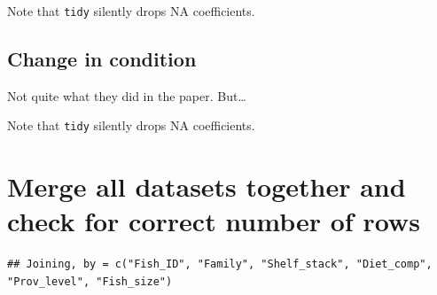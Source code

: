 \documentclass[]{book}
\newenvironment{Shaded}{\begin{snugshade}}{\end{snugshade}}
\newcommand{\DataTypeTok}[1]{\textcolor[rgb]{0.13,0.29,0.53}{#1}}
\newcommand{\KeywordTok}[1]{\textcolor[rgb]{0.13,0.29,0.53}{\textbf{#1}}}
\newcommand{\NormalTok}[1]{#1}
\newcommand{\OperatorTok}[1]{\textcolor[rgb]{0.81,0.36,0.00}{\textbf{#1}}}
\newcommand{\StringTok}[1]{\textcolor[rgb]{0.31,0.60,0.02}{#1}}
\begin{document}
Note that \texttt{tidy} silently drops NA coefficients.

\hypertarget{change-in-condition}{%
\subsection{Change in condition}\label{change-in-condition}}

Not quite what they did in the paper. But\ldots{}

\begin{Shaded}
\end{Shaded}

Note that \texttt{tidy} silently drops NA coefficients.

\hypertarget{merge-all-datasets-together-and-check-for-correct-number-of-rows}{%
\section{Merge all datasets together and check for correct number of rows}\label{merge-all-datasets-together-and-check-for-correct-number-of-rows}}

\begin{Shaded}
\end{Shaded}

\begin{verbatim}
## Joining, by = c("Fish_ID", "Family", "Shelf_stack", "Diet_comp", "Prov_level", "Fish_size")
\end{verbatim}
\end{document}

